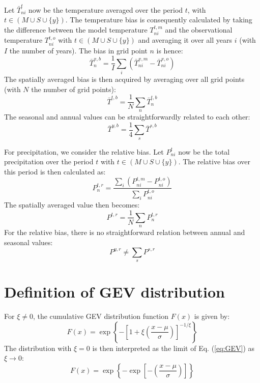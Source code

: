 \documentclass[journal abbreviation, manuscript]{copernicus}
\begin{document}
Let $\bar{T}^{t}_{ni}$ now be the temperature averaged over the period $t$, with $t \in (M \cup S \cup \{y\})$. The temperature bias is consequently calculated by taking the difference between the model temperature $T^{t,m}_{ni}$ and the observational temperature $T^{t,o}_{ni}$ with $t \in (M \cup S \cup \{y\})$ and averaging it over all years $i$ (with $I$ the number of years). The bias in grid point $n$ is hence:
\begin{equation*}
    \bar{T}^{x,b}_{n} = \frac{1}{I} \sum_{i} \left(\bar{T}^{x,m}_{ni} - \bar{T}^{x,o}_{ni} \right)
\end{equation*}
The spatially averaged bias is then acquired by averaging over all grid points (with $N$ the number of grid points):
\begin{equation*}
    \bar{T}^{t,b} = \frac{1}{N} \sum_{n} \bar{T}^{t,b}_{n} 
\end{equation*}
The seasonal and annual values can be straightforwardly related to each other:
\begin{equation*}
    \bar{T}^{y,b} = \frac{1}{4} \sum_{s} \bar{T}^{s,b}
\end{equation*}

For precipitation, we consider the relative bias. Let $P^{t}_{ni}$ now be the total precipitation over the period $t$ with $t \in (M \cup S \cup \{y\})$. The relative bias over this period is then calculated as:
\begin{equation*}
    P^{t,r}_{n} = \frac{ \sum_{i} \left(P^{t,m}_{ni} - P^{t,o}_{ni} \right)}{\sum_{i} P^{t,o}_{ni}}
\end{equation*}
The spatially averaged value then becomes:
\begin{equation*}
    P^{t,r} = \frac{1}{N} \sum_{n} P^{t,r}_{n}
\end{equation*}
For the relative bias, there is no straightforward relation between annual and seasonal values: 
\begin{equation*}
    P^{y,r} \neq \sum_{s} P^{s,r}
\end{equation*}

\section{Definition of GEV distribution}
\label{sect:gev_definition}

For $\xi \neq 0$, the cumulative GEV distribution function $F(x)$ is given by: 
\begin{equation}
    F(x) = \exp \left\{- \left[1 + \xi \left(\frac{x - \mu}{\sigma} \right) \right]^{-1/\xi} \right\}
\label{eq:GEV}
\end{equation}
The distribution with $\xi = 0$ is then interpreted as the limit of Eq. (\ref{eq:GEV}) as $\xi \to 0$:
\begin{equation}
    F(x) = \exp \left\{- \exp \left[- \left(\frac{x - \mu}{\sigma} \right) \right] \right\}
\label{eq:GEV0}
\end{equation}
\end{document}
